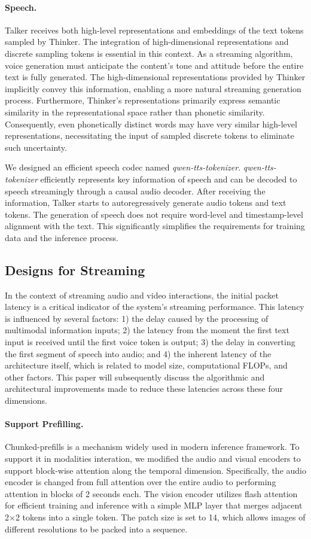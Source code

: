 \paragraph{Speech.} Talker receives both high-level representations and embeddings of the text tokens sampled by Thinker. The integration of high-dimensional representations and discrete sampling tokens is essential in this context. As a streaming algorithm, voice generation must anticipate the content's tone and attitude before the entire text is fully generated. The high-dimensional representations provided by Thinker implicitly convey this information, enabling a more natural streaming generation process. Furthermore, Thinker's representations primarily express semantic similarity in the representational space rather than phonetic similarity. Consequently, even phonetically distinct words may have very similar high-level representations, necessitating the input of sampled discrete tokens to eliminate such uncertainty.

We designed an efficient speech codec named \textit{qwen-tts-tokenizer}. \textit{qwen-tts-tokenizer} efficiently represents key information of speech and can be decoded to speech streamingly through a causal audio decoder. After receiving the information, Talker starts to autoregressively generate audio tokens and text tokens. The generation of speech does not require word-level and timestamp-level alignment with the text. This significantly simplifies the requirements for training data and the inference process.

\subsection{Designs for Streaming}
In the context of streaming audio and video interactions, the initial packet latency is a critical indicator of the system's streaming performance. This latency is influenced by several factors: 1) the delay caused by the processing of multimodal information inputs; 2) the latency from the moment the first text input is received until the first voice token is output; 3) the delay in converting the first segment of speech into audio; and 4) the inherent latency of the architecture itself, which is related to model size, computational FLOPs, and other factors. This paper will subsequently discuss the algorithmic and architectural improvements made to reduce these latencies across these four dimensions.

\paragraph{Support Prefilling.} Chunked-prefills is a mechanism widely used in modern inference framework. To support it in modalities interation, we modified the audio and visual encoders to support block-wise attention along the temporal dimension. Specifically, the audio encoder is changed from full attention over the entire audio to performing attention in blocks of 2 seconds each. The vision encoder utilizes flash attention for efficient training and inference with a simple MLP layer that merges adjacent 2×2 tokens into a single token. The patch size is set to 14, which allows images of different resolutions to be packed into a sequence.

